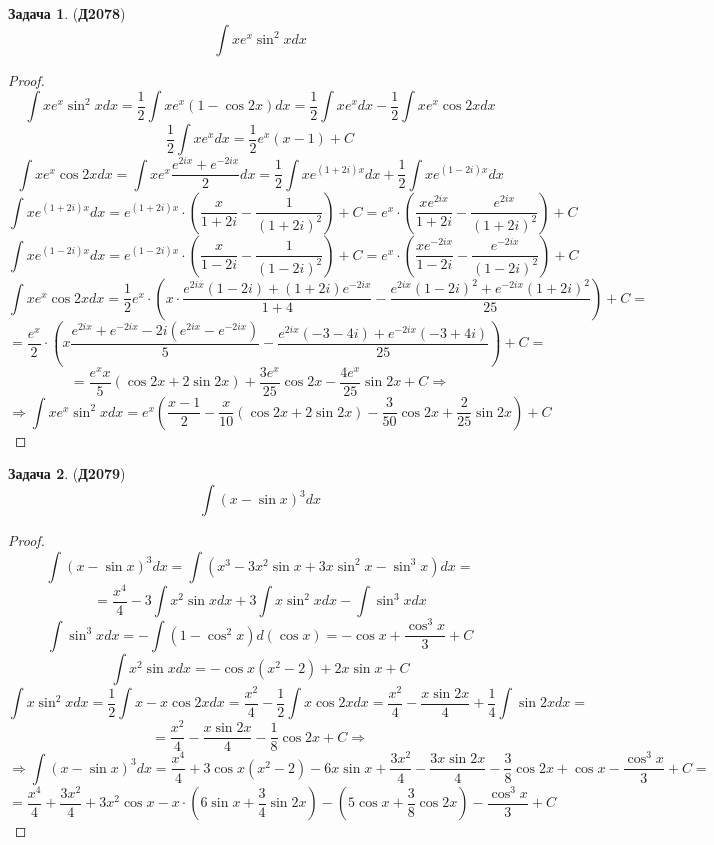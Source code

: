 \documentclass[12pt]{article}
\theoremstyle{definition}
\newtheorem{problem}{Задача}
\DeclareMathOperator{\dint}{\displaystyle\int}
\begin{document}
\begin{problem}(\textbf{Д2078})
	$$
		\dint xe^x \sin^2{x}dx
	$$
\end{problem}
\begin{proof}
	$$
		\dint xe^x \sin^2{x}dx = \dfrac{1}{2}\dint xe^x(1 - \cos{2x})dx = \dfrac{1}{2}\dint xe^xdx - \dfrac{1}{2}\dint xe^x \cos{2x}dx
	$$
	$$
		\dfrac{1}{2}\dint xe^xdx = \dfrac{1}{2}e^x(x - 1) + C
	$$
	$$
		\dint xe^x \cos{2x}dx = \dint x e^{x}\dfrac{e^{2ix} + e^{-2ix}}{2}dx = \dfrac{1}{2}\dint x e^{(1 + 2i)x}dx + \dfrac{1}{2}\dint xe^{(1 - 2i)x}dx
	$$
	$$
		\dint x e^{(1 + 2i)x}dx = e^{(1 + 2i)x}{\cdot}\left(\dfrac{x}{1+2i} - \dfrac{1}{(1 + 2i)^2}\right) + C = e^x{\cdot}\left(\dfrac{xe^{2ix}}{1 + 2i} - \dfrac{e^{2ix}}{(1 + 2i)^2}\right) + C
	$$
	$$
		\dint x e^{(1 - 2i)x}dx = e^{(1 - 2i)x}{\cdot}\left(\dfrac{x}{1-2i} - \dfrac{1}{(1 - 2i)^2}\right) + C = e^x{\cdot}\left(\dfrac{xe^{-2ix}}{1 - 2i} - \dfrac{e^{-2ix}}{(1 - 2i)^2}\right) + C
	$$
	$$
		\dint xe^x \cos{2x}dx  = \dfrac{1}{2}e^x{\cdot}\left(x{\cdot}\dfrac{e^{2ix}(1-2i) +(1 + 2i)e^{-2ix}}{1 +4} - \dfrac{e^{2ix}(1 -2i)^2  + e^{-2ix}(1 + 2i)^2 }{25}\right) + C =
	$$
	$$
		=\dfrac{e^x}{2}{\cdot}\left(x\dfrac{e^{2ix} + e^{-2ix} -2i(e^{2ix} -e^{-2ix})}{5} - \dfrac{e^{2ix}(-3 -4i) + e^{-2ix}(-3 + 4i)}{25}\right) + C =
	$$
	$$
		=	\dfrac{e^xx}{5}(\cos{2x} + 2 \sin{2x}) + \dfrac{3e^{x}}{25}\cos{2x} - \dfrac{4e^x}{25}\sin{2x} + C \Rightarrow
	$$
	$$
		\Rightarrow \dint xe^x \sin^2{x}dx = e^x \left(\dfrac{x-1}{2}  -\dfrac{x}{10}(\cos{2x} + 2\sin{2x}) - \dfrac{3}{50}\cos{2x} + \dfrac{2}{25}\sin{2x}\right) + C
	$$
\end{proof}

\begin{problem}(\textbf{Д2079})
	$$
		\dint (x - \sin{x})^3 dx
	$$
\end{problem}
\begin{proof}
	$$
		\dint (x - \sin{x})^3 dx = \dint (x^3 - 3x^2 \sin{x} + 3x \sin^2{x} - \sin^3{x})dx = 
	$$
	$$
		= \dfrac{x^4}{4} - 3\dint x^2 \sin{x}dx + 3\dint x \sin^2{x}dx -\dint \sin^3{x}dx
	$$
	$$
		\dint \sin^3{x}dx = -\dint (1 -\cos^2{x})d(\cos{x}) = -\cos{x} +\dfrac{\cos^3{x}}{3} + C
	$$
	$$
		\dint x^2 \sin{x}dx = -\cos{x}(x^2 -2) + 2x\sin{x} + C
	$$
	$$
		\dint x \sin^2{x}dx = \dfrac{1}{2}\dint x  - x \cos{2x}dx = \dfrac{x^2}{4} - \dfrac{1}{2}\dint x\cos{2x}dx = \dfrac{x^2}{4} - \dfrac{x\sin{2x}}{4} + \dfrac{1}{4}\dint \sin{2x}dx =
	$$
	$$
		=	\dfrac{x^2}{4} -\dfrac{x\sin{2x}}{4} - \dfrac{1}{8}\cos{2x} + C \Rightarrow
	$$
	$$
		\Rightarrow \dint (x - \sin{x})^3 dx = \dfrac{x^4}{4} + 3\cos{x}(x^2 - 2) -6x \sin{x} + \dfrac{3x^2}{4} - \dfrac{3x\sin{2x}}{4}  -\dfrac{3}{8}\cos{2x} + \cos{x} - \dfrac{\cos^3{x}}{3} + C =
	$$
	$$
		=\dfrac{x^4}{4} + \dfrac{3x^2}{4} + 3x^2\cos{x} - x{\cdot}\left(6\sin{x} +\dfrac{3}{4}\sin{2x}\right) - \left(5\cos{x} +\dfrac{3}{8}\cos{2x}\right) - \dfrac{\cos^3{x}}{3} + C
	$$
\end{proof}
\end{document}
